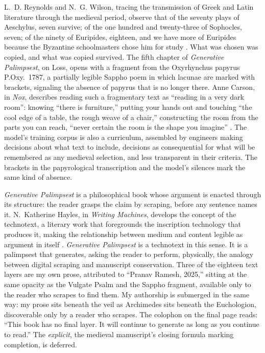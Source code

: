 \documentclass[12pt]{article}
\begin{document}
L.~D. Reynolds and N.~G. Wilson, tracing the transmission of Greek and Latin
literature through the medieval period, observe that of the seventy plays of
Aeschylus, seven survive; of the one hundred and twenty-three of Sophocles,
seven; of the ninety of Euripides, eighteen, and we have more of Euripides
because the Byzantine schoolmasters chose him for study \parencite{reynolds1991}.
What was chosen was copied, and what was copied survived. The fifth chapter of \textit{Generative
  Palimpsest}, on Loss, opens with a fragment from the Oxyrhynchus papyrus
P.Oxy.~1787, a partially legible Sappho poem in which lacunae are marked with
brackets, signaling the absence of papyrus that is no longer there. Anne
Carson, in \textit{Nox}, describes reading such a fragmentary text as ``reading
in a very dark room'': knowing ``there is furniture,'' putting your hands out
and touching ``the cool edge of a table, the rough weave of a chair,''
constructing the room from the parts you can reach, ``never certain the room is
the shape you imagine'' \parencite{carson2010}. The model's training corpus is also a curriculum,
assembled by engineers making decisions about what text to include, decisions as
consequential for what will be remembered as any medieval selection, and less
transparent in their criteria. The brackets in the
papyrological transcription and the model's silences mark the same kind of
absence.

\textit{Generative Palimpsest} is a philosophical book whose argument is enacted
through its structure: the reader grasps the claim by scraping, before any
sentence names it. N.~Katherine Hayles, in \textit{Writing Machines}, develops the
concept of the technotext, a literary work that foregrounds the inscription
technology that produces it, making the relationship between medium and content
legible as argument in itself \parencite{hayles2002}. \textit{Generative
  Palimpsest} is a technotext
in this sense. It is a palimpsest that generates, asking the reader to perform, physically,
the analogy between digital scraping and manuscript conservation. Three of the eighteen text layers are my
own prose, attributed to ``Pranav Ramesh, 2025,'' sitting at the same opacity
as the Vulgate Psalm and the Sappho fragment, available only to the reader who
scrapes to find them.
My authorship is submerged in the same way: my prose sits beneath the veil
as Archimedes sits beneath the Euchologion, discoverable only by a reader who
scrapes. The colophon on the final page reads: ``This book has
no final layer. It will continue to generate as long as you continue to read.''
The \textit{explicit}, the medieval manuscript's closing formula marking
completion, is deferred.
\end{document}
